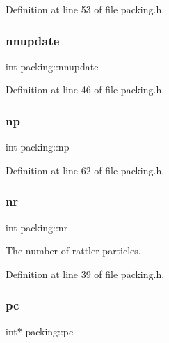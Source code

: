 Definition at line 53 of file packing.\+h.

\mbox{\label{classpacking_aae18c45219be166f5f1e44ab838f2252}} 
\subsubsection{\texorpdfstring{nnupdate}{nnupdate}}
{\footnotesize\ttfamily int packing\+::nnupdate\hspace{0.3cm}{\ttfamily [protected]}}



Definition at line 46 of file packing.\+h.

\mbox{\label{classpacking_a2e20ad3bfc90e5c328dddd7da34291e1}} 
\subsubsection{\texorpdfstring{np}{np}}
{\footnotesize\ttfamily int packing\+::np\hspace{0.3cm}{\ttfamily [protected]}}



Definition at line 62 of file packing.\+h.

\mbox{\label{classpacking_a31eede3d604c45fef6021170ee506c77}} 
\subsubsection{\texorpdfstring{nr}{nr}}
{\footnotesize\ttfamily int packing\+::nr\hspace{0.3cm}{\ttfamily [protected]}}



The number of rattler particles. 



Definition at line 39 of file packing.\+h.

\mbox{\label{classpacking_abbc23675b258dfad02a53e578c1e4589}} 
\subsubsection{\texorpdfstring{pc}{pc}}
{\footnotesize\ttfamily int$\ast$ packing\+::pc\hspace{0.3cm}{\ttfamily [protected]}}



